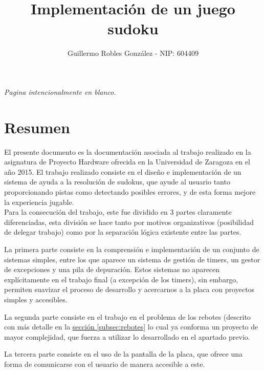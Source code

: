 \documentclass[12pt,letterpaper]{article}
\title{Implementación de un juego sudoku} %
\author{Guillermo Robles González - NIP: 604409}
\newcommand*{\blankpage}[1]{%
  \vspace*{\fill}
  \begin{center} \textit{#1} \end{center}
  \vspace{\fill}
  \clearpage}
\newcommand*{\iref}[2]{
  \hyperref[#1]{#2
  \ref*{#1}}
  }
\begin{document}
\shorthandoff{>}
\shorthandoff{<}
\maketitle
\blankpage{Pagina intencionalmente en blanco.}
\tableofcontents
\clearpage

\section{Resumen}
\label{sec:resumen}

El presente documento es la documentación asociada al trabajo realizado
en la asignatura de Proyecto Hardware ofrecida en la Universidad de
Zaragoza en el año 2015. El trabajo realizado consiste en el diseño e
implementación de un sistema de ayuda a la resolución de sudokus, que
ayude al usuario tanto proporcionando pistas como detectando posibles
errores, y de esta forma mejore la experiencia jugable.\\

Para la consecución del trabajo, este fue dividido en 3 partes
claramente diferenciadas, esta división se hace tanto por motivos
organizativos (posibilidad de delegar trabajo) como por la separación
lógica existente entre las partes.

La primera parte consiste en la comprensión e implementación de un
conjunto de sistemas simples, entre los que aparece un sistema de
gestión de timers, un gestor de excepciones y una pila de
depuración. Estos sistemas no aparecen explícitamente en el trabajo
final (a excepción de los timers), sin embargo, permiten suavizar el
proceso de desarrollo y acercarnos a la placa con proyectos simples y
accesibles.

La segunda parte consiste en el trabajo en el problema de los rebotes
(descrito con más detalle en la \iref{subsec:rebotes}{sección} lo cual
ya conforma un proyecto de mayor complejidad, que fuerza a utilizar lo
desarrollado en el apartado previo.

La tercera parte consiste en el uso de la pantalla de la placa, que
ofrece una forma de comunicarse con el usuario de manera accesible a
este.
\end{document}
